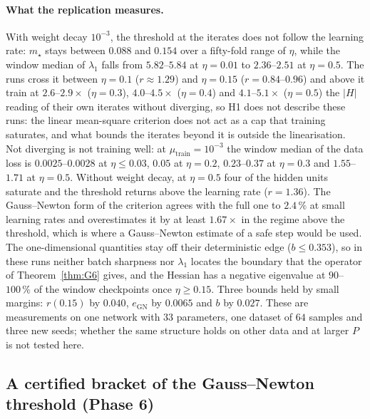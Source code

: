 \documentclass[11pt]{article}
\theoremstyle{remark}
\begin{document}
\paragraph{What the replication measures.} With weight decay $10^{-3}$, the threshold at the iterates does not follow the learning rate: $m_\star$ stays between $0.088$ and $0.154$ over a fifty-fold range of $\eta$, while the window median of $\lambda_1$ falls from $5.82$--$5.84$ at $\eta=0.01$ to $2.36$--$2.51$ at $\eta=0.5$. The runs cross it between $\eta=0.1$ ($r\approx1.29$) and $\eta=0.15$ ($r=0.84$--$0.96$) and above it train at $2.6$--$2.9\times$ ($\eta=0.3$), $4.0$--$4.5\times$ ($\eta=0.4$) and $4.1$--$5.1\times$ ($\eta=0.5$) the $|H|$ reading of their own iterates without diverging, so H1 does not describe these runs: the linear mean-square criterion does not act as a cap that training saturates, and what bounds the iterates beyond it is outside the linearisation. Not diverging is not training well: at $\mu_{\mathrm{train}}=10^{-3}$ the window median of the data loss is $0.0025$--$0.0028$ at $\eta\le0.03$, $0.05$ at $\eta=0.2$, $0.23$--$0.37$ at $\eta=0.3$ and $1.55$--$1.71$ at $\eta=0.5$. Without weight decay, at $\eta=0.5$ four of the hidden units saturate and the threshold returns above the learning rate ($r=1.36$). The Gauss--Newton form of the criterion agrees with the full one to $2.4\,\%$ at small learning rates and overestimates it by at least $1.67\times$ in the regime above the threshold, which is where a Gauss--Newton estimate of a safe step would be used. The one-dimensional quantities stay off their deterministic edge ($b\le0.353$), so in these runs neither batch sharpness nor $\lambda_1$ locates the boundary that the operator of Theorem~\ref{thm:G6} gives, and the Hessian has a negative eigenvalue at $90$--$100\,\%$ of the window checkpoints once $\eta\ge0.15$. Three bounds held by small margins: $r(0.15)$ by $0.040$, $e_{\mathrm{GN}}$ by $0.0065$ and $b$ by $0.027$. These are measurements on one network with $33$ parameters, one dataset of $64$ samples and three new seeds; whether the same structure holds on other data and at larger $P$ is not tested here.

\subsection{A certified bracket of the Gauss--Newton threshold (Phase 6)}\label{sec:phase6}
\end{document}
